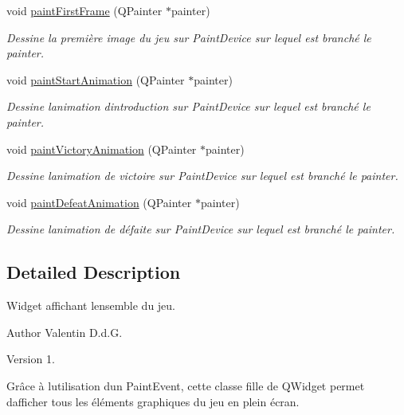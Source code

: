 \begin{DoxyCompactItemize}
void \hyperlink{class_pacscreen_a7d75e03446f7e8edac55a6896b2a3c40}{paint\+First\+Frame} (Q\+Painter $\ast$painter)
\begin{DoxyCompactList}\small\item\em Dessine la première image du jeu sur Paint\+Device sur lequel est branché le painter. \end{DoxyCompactList}\item 
void \hyperlink{class_pacscreen_afeb89930eaa69c8b952af7b5653afc6c}{paint\+Start\+Animation} (Q\+Painter $\ast$painter)
\begin{DoxyCompactList}\small\item\em Dessine l\textquotesingle{}animation d\textquotesingle{}introduction sur Paint\+Device sur lequel est branché le painter. \end{DoxyCompactList}\item 
void \hyperlink{class_pacscreen_a646b6aab801e38b3eae62b255183f83b}{paint\+Victory\+Animation} (Q\+Painter $\ast$painter)
\begin{DoxyCompactList}\small\item\em Dessine l\textquotesingle{}animation de victoire sur Paint\+Device sur lequel est branché le painter. \end{DoxyCompactList}\item 
void \hyperlink{class_pacscreen_ae1d6b203e0b0dcb57bb3e9065fab46fa}{paint\+Defeat\+Animation} (Q\+Painter $\ast$painter)
\begin{DoxyCompactList}\small\item\em Dessine l\textquotesingle{}animation de défaite sur Paint\+Device sur lequel est branché le painter. \end{DoxyCompactList}\end{DoxyCompactItemize}


\subsection{Detailed Description}
Widget affichant l\textquotesingle{}ensemble du jeu. 

\begin{DoxyAuthor}{Author}
Valentin D.\+d.\+G. 
\end{DoxyAuthor}
\begin{DoxyVersion}{Version}
1.
\end{DoxyVersion}
Grâce à l\textquotesingle{}utilisation d\textquotesingle{}un Paint\+Event, cette classe fille de Q\+Widget permet d\textquotesingle{}afficher tous les éléments graphiques du jeu en plein écran.

